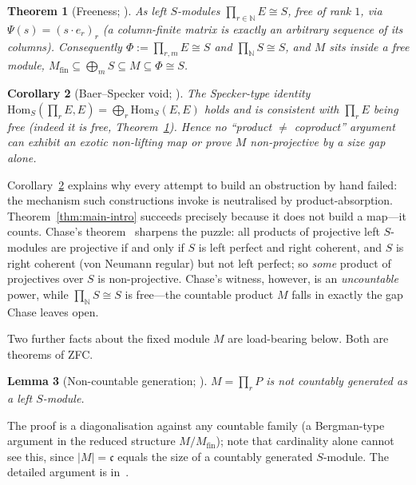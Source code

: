 \documentclass[11pt,reqno]{amsart}
\theoremstyle{plain}
\newtheorem{theorem}{Theorem}[section]
\newtheorem{lemma}[theorem]{Lemma}
\newtheorem{corollary}[theorem]{Corollary}
\theoremstyle{definition}
\theoremstyle{remark}
\newcommand{\Hom}{\mathrm{Hom}}
\newcommand{\N}{\mathbb{N}}
\begin{document}
\begin{theorem}[Freeness; {\cite[Thm.~2]{macbeth-reduction}}]\label{thm:free}
As left $S$-modules $\prod_{r\in\N}E\cong S$, free of rank $1$, via $\Psi(s)=(s\cdot e_r)_r$ (a column-finite matrix is exactly an arbitrary sequence of its columns). Consequently $\Phi:=\prod_{r,m}E\cong S$ and $\prod_{\N}S\cong S$, and $M$ sits inside a free module, $M_{\mathrm{fin}}\subseteq\bigoplus_m S\subseteq M\subseteq\Phi\cong S$.
\end{theorem}

\begin{corollary}[Baer--Specker void; {\cite[Thm.~4]{macbeth-reduction}}]\label{cor:bs-void}
The Specker-type identity $\Hom_S(\prod_r E,E)=\bigoplus_r\Hom_S(E,E)$ holds and is \emph{consistent with $\prod_r E$ being free} (indeed it is free, Theorem~\ref{thm:free}). Hence no ``product $\ne$ coproduct'' argument can exhibit an exotic non-lifting map or prove $M$ non-projective by a size gap alone.
\end{corollary}

Corollary~\ref{cor:bs-void} explains why every attempt to build an obstruction by hand failed: the mechanism such constructions invoke is neutralised by product-absorption. Theorem~\ref{thm:main-intro} succeeds precisely because it does not build a map---it counts. Chase's theorem~\cite{chase} sharpens the puzzle: all products of projective left $S$-modules are projective if and only if $S$ is left perfect and right coherent, and $S$ is right coherent (von Neumann regular) but not left perfect; so \emph{some} product of projectives over $S$ is non-projective. Chase's witness, however, is an \emph{uncountable} power, while $\prod_{\N}S\cong S$ is free---the countable product $M$ falls in exactly the gap Chase leaves open.

Two further facts about the fixed module $M$ are load-bearing below. Both are theorems of ZFC.

\begin{lemma}[Non-countable generation; {\cite[\S5, F1]{macbeth-reduction}}]\label{lem:F1}
$M=\prod_r P$ is not countably generated as a left $S$-module.
\end{lemma}

The proof is a diagonalisation against any countable family (a Bergman-type argument in the reduced structure $M/M_{\mathrm{fin}}$); note that cardinality alone cannot see this, since $|M|=\mathfrak c$ equals the size of a countably generated $S$-module. The detailed argument is in~\cite[\S5]{macbeth-reduction}.
\end{document}

